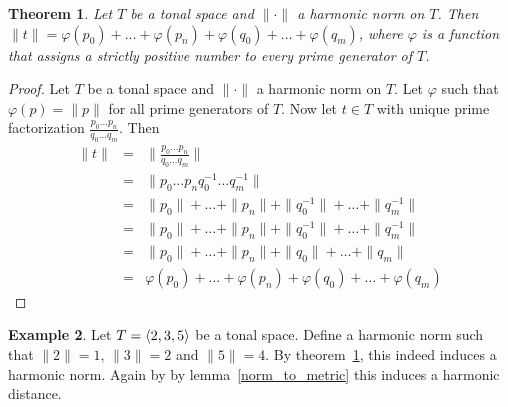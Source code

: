 \documentclass[a4paper]{book}
\newtheorem{theorem}{Theorem}[chapter]
\theoremstyle{definition}
\newtheorem{example}[theorem]{Example}
\begin{document}
\begin{theorem}
    Let $T$ be a tonal space and $\| \cdot \|$ a harmonic norm on $T$.
    Then $\|t\| = \varphi(p_0) + \dots + \varphi(p_n) + \varphi(q_0) + \dots + \varphi(q_m)$, where $\varphi$ is a function that assigns a strictly positive number to every prime generator of $T$.
    \label{function_to_harmonic_norm}
\end{theorem}
\begin{proof}
    Let $T$ be a tonal space and $\| \cdot \|$ a harmonic norm on $T$.
    Let $\varphi$ such that $\varphi(p) = \|p\|$ for all prime generators of $T$.
    Now let $t \in T$ with unique prime factorization $\frac{p_0 \dots p_n}{q_0 \dots q_m}$.
    Then 
    \begin{eqnarray*}
        \|t\| &=& \|\frac{p_0 \dots p_n}{q_0 \dots q_m}\| \\
            &=& \|p_0 \dots p_nq_0^{-1} \dots q_m^{-1}\| \\
            &=& \|p_0\|+ \dots + \|p_n\| + \|q_0^{-1}\| + \dots + \|q_m^{-1}\| \\
            &=& \|p_0\|+ \dots + \|p_n\| + \|q_0^{-1}\| + \dots + \|q_m^{-1}\| \\
            &=& \|p_0\|+ \dots + \|p_n\| + \|q_0\| + \dots + \|q_m\|\\
            &=& \varphi(p_0) + \dots + \varphi(p_n) + \varphi(q_0) + \dots + \varphi(q_m)
    \end{eqnarray*}
\end{proof}


\begin{example}
    \label{eulers_formula}
    Let $T = \langle 2,3,5 \rangle$ be a tonal space.
    Define a harmonic norm such that $\|2\| = 1$, $\|3\| = 2$ and $\|5\| = 4$.
    By theorem~\ref{function_to_harmonic_norm}, this indeed induces a harmonic norm.
    Again by by lemma~\ref{norm_to_metric} this induces a harmonic distance.
\end{example}
\end{document}
